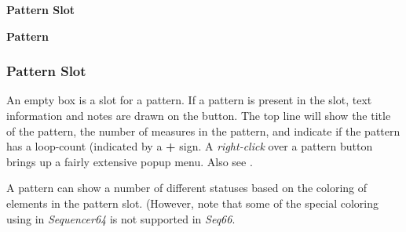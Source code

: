    \begin{enumber}
      \item \textbf{Pattern Slot}
      \item \textbf{Pattern}
   \end{enumber}

\subsubsection{Pattern Slot}
\label{subsubsec:patterns_pattern_slot}

   An empty box is a slot for a pattern.
   If a pattern is present in the slot, text information and notes are drawn on
   the button.
   The top line will show
   the title of the pattern, the number of measures in the pattern, and
   indicate if the pattern has a loop-count (indicated by a
   \textbf{+} sign.
   A \textsl{right-click} over a pattern button brings up a fairly extensive
   popup menu.
   Also see .

%

   A pattern can show a number of different statuses based on the coloring
   of elements in the pattern slot.
   (However, note that some of the special coloring using in
   \textsl{Sequencer64} is not supported in \textsl{Seq66}.

